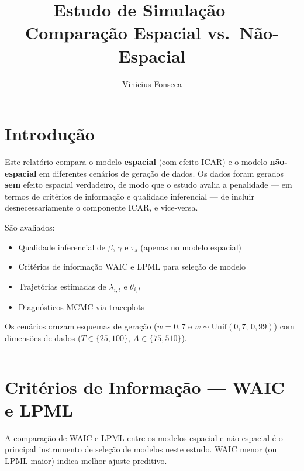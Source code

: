 \documentclass[
]{article}
\title{Estudo de Simulação --- Comparação Espacial vs.~Não-Espacial}
\author{Vinicius Fonseca}
\date{}
\providecommand{\tightlist}{%
  \setlength{\itemsep}{0pt}\setlength{\parskip}{0pt}}
\begin{document}
\maketitle

{
\setcounter{tocdepth}{2}
\tableofcontents
}
\section{Introdução}\label{introduuxe7uxe3o}

Este relatório compara o modelo \textbf{espacial} (com efeito ICAR) e o
modelo \textbf{não-espacial} em diferentes cenários de geração de dados.
Os dados foram gerados \textbf{sem} efeito espacial verdadeiro, de modo
que o estudo avalia a penalidade --- em termos de critérios de
informação e qualidade inferencial --- de incluir desnecessariamente o
componente ICAR, e vice-versa.

São avaliados:

\begin{itemize}
\tightlist
\item
  Qualidade inferencial de \(\beta\), \(\gamma\) e \(\tau_s\) (apenas no
  modelo espacial)
\item
  Critérios de informação WAIC e LPML para seleção de modelo
\item
  Trajetórias estimadas de \(\lambda_{i,t}\) e \(\theta_{i,t}\)
\item
  Diagnósticos MCMC via traceplots
\end{itemize}

Os cenários cruzam esquemas de geração (\(w = 0{,}7\) e
\(w \sim \text{Unif}(0{,}7;\,0{,}99)\)) com dimensões de dados
(\(T \in \{25, 100\}\), \(A \in \{75, 510\}\)).

\begin{center}\rule{0.5\linewidth}{0.5pt}\end{center}

\section{Critérios de Informação --- WAIC e
LPML}\label{crituxe9rios-de-informauxe7uxe3o-waic-e-lpml}

A comparação de WAIC e LPML entre os modelos espacial e não-espacial é o
principal instrumento de seleção de modelos neste estudo. WAIC menor (ou
LPML maior) indica melhor ajuste preditivo.

\begingroup\fontsize{9}{11}\selectfont
\end{document}
